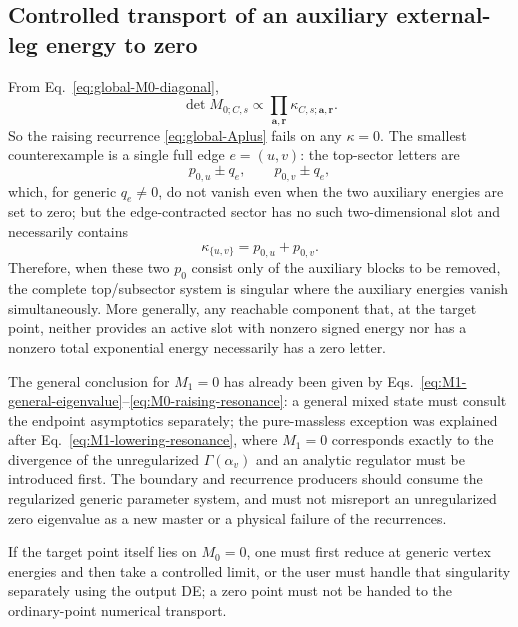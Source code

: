 \documentclass[11pt,a4paper]{article}
\begin{document}
\subsection{Controlled transport of an auxiliary external-leg energy to zero}

From Eq.~\eqref{eq:global-M0-diagonal},
\begin{equation}
 \det M_{0;C,s}\propto
 \prod_{\bm a,\bm r}\kappa_{C,s;\bm a,\bm r}.
 \label{eq:M0-determinant-letters}
\end{equation}
So the raising recurrence \eqref{eq:global-Aplus} fails on any $\kappa=0$. The smallest counterexample is a single full edge $e=(u,v)$: the top-sector letters are
\begin{equation}
 p_{0,u}\pm q_e,
 \qquad
 p_{0,v}\pm q_e,
 \end{equation}
which, for generic $q_e\neq0$, do not vanish even when the two auxiliary energies are set to zero; but the edge-contracted sector has no such two-dimensional slot and necessarily contains
\begin{equation}
 \kappa_{\{u,v\}}=p_{0,u}+p_{0,v}.
 \label{eq:contracted-zero-letter}
\end{equation}
Therefore, when these two $p_0$ consist only of the auxiliary blocks to be removed, the complete top/subsector system is singular where the auxiliary energies vanish simultaneously. More generally, any reachable component that, at the target point, neither provides an active slot with nonzero signed energy nor has a nonzero total exponential energy necessarily has a zero letter.

The general conclusion for $M_1=0$ has already been given by Eqs.~\eqref{eq:M1-general-eigenvalue}--\eqref{eq:M0-raising-resonance}: a general mixed state must consult the endpoint asymptotics separately; the pure-massless exception was explained after Eq.~\eqref{eq:M1-lowering-resonance}, where $M_1=0$ corresponds exactly to the divergence of the unregularized $\Gamma(\alpha_v)$ and an analytic regulator must be introduced first. The boundary and recurrence producers should consume the regularized generic parameter system, and must not misreport an unregularized zero eigenvalue as a new master or a physical failure of the recurrences.

If the target point itself lies on $M_0=0$, one must first reduce at generic vertex energies and then take a controlled limit, or the user must handle that singularity separately using the output DE; a zero point must not be handed to the ordinary-point numerical transport.
\end{document}
